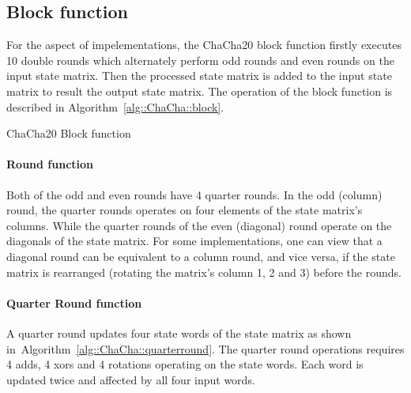 \subsection{Block function}
For the aspect of impelementations, the ChaCha20 block function firstly executes 10 double rounds which alternately perform odd rounds and even rounds on the input state matrix. Then the processed state matrix is added to the input state matrix to result the output state matrix. The operation of the block function is described in Algorithm~\ref{alg::ChaCha::block}.

\begin{algorithm}
	\BlankLine
	\caption{ChaCha20 Block function}
	\label{alg::ChaCha::block}
\end{algorithm}

\paragraph{Round function} Both of the odd and even rounds have 4 quarter rounds.
In the odd (column) round, the quarter rounds operates on four elements of the state matrix's columns.
While the quarter rounds of the even (diagonal) round operate on the diagonals of the state matrix.
For some implementations, one can view that a diagonal round can be equivalent to a column round, and vice versa, if the state matrix is rearranged (rotating the matrix's column 1, 2 and 3) before the rounds. 

\paragraph{Quarter Round function} A quarter round updates four state words of the state matrix as shown in~Algorithm~\ref{alg::ChaCha::quarterround}. 
The quarter round operations requires 4 adds, 4 xors and 4 rotations operating on the state words. 
Each word is updated twice and affected by all four input words.

